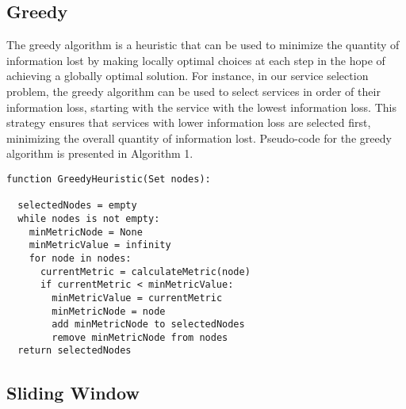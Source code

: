 \subsection*{Greedy}
The greedy algorithm is a heuristic that can be used to minimize the quantity of information lost by making locally optimal choices at each step in the hope of achieving a globally optimal solution.
For instance, in our service selection problem, the greedy algorithm can be used to select services in order of their information loss, starting with the service with the lowest information loss.
This strategy ensures that services with lower information loss are selected first, minimizing the overall quantity of information lost.
Pseudo-code for the greedy algorithm is presented in Algorithm 1.
\begin{lstlisting}[frame=single,caption={Greedy Heuristic Pseudocode},label={lst:greedy}]
function GreedyHeuristic(Set nodes):

  selectedNodes = empty
  while nodes is not empty:
    minMetricNode = None
    minMetricValue = infinity
    for node in nodes:
      currentMetric = calculateMetric(node)
      if currentMetric < minMetricValue:
        minMetricValue = currentMetric
        minMetricNode = node
        add minMetricNode to selectedNodes
        remove minMetricNode from nodes
  return selectedNodes
        \end{lstlisting}

\subsection{Sliding Window}

